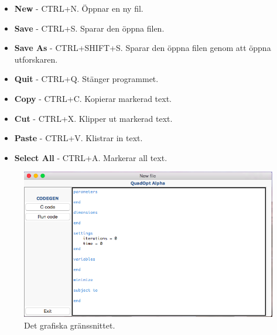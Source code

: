 \begin{itemize}
	\item \textbf{New} - CTRL+N. Öppnar en ny fil. 
	\item \textbf{Save} - CTRL+S. Sparar den öppna filen.
	\item \textbf{Save As} - CTRL+SHIFT+S. Sparar den öppna filen genom att öppna utforskaren.
	\item \textbf{Quit} - CTRL+Q. Stänger programmet.
	\item \textbf{Copy} - CTRL+C. Kopierar markerad text.
	\item \textbf{Cut} - CTRL+X. Klipper ut markerad text.
	\item \textbf{Paste} - CTRL+V. Klistrar in text.
	\item \textbf{Select All} - CTRL+A. Markerar all text.
\end{itemize}

\begin{figure}[H]
\includegraphics[scale=0.52]{bilder/macgui.png}
\caption{Det grafiska gränssnittet.}
\label{fig:gui}
\end{figure}
